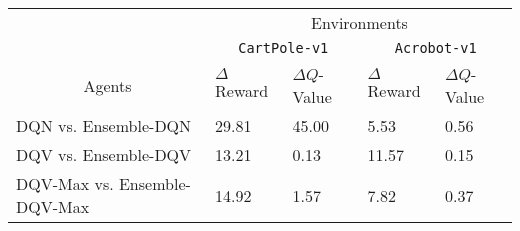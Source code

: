 \documentclass{article}
\begin{document}
\begin{table}[]
\begin{tabular}{@{}lllll@{}}
\toprule
\multicolumn{1}{c}{}                               & \multicolumn{4}{c}{Environments}                                                                                                                                                         \\
\multicolumn{1}{c}{}                               & \multicolumn{2}{c}{\texttt{CartPole-v1}}                                        & \multicolumn{2}{c}{\texttt{Acrobot-v1}}                                                                \\ \cmidrule(l){2-5}
\multicolumn{1}{c}{\multirow{-3}{*}{Agents}}       & $\Delta$Reward
                                                   & $\Delta Q$-Value
                                                                                                                                     & $\Delta$Reward                                             & $\Delta Q$-Value                                         \\ \midrule
\multicolumn{1}{|l|}{DQN vs. Ensemble-DQN}         & \multicolumn{1}{l|}{29.81} & \multicolumn{1}{l|}{\cellcolor[HTML]{FFFC9E}45.00} & \multicolumn{1}{l|}{\cellcolor[HTML]{FFFC9E}5.53}  & \multicolumn{1}{l|}{\cellcolor[HTML]{FFFC9E}0.56} \\ \midrule
\multicolumn{1}{|l|}{DQV vs. Ensemble-DQV}         & \multicolumn{1}{l|}{13.21} & \multicolumn{1}{l|}{0.13}                          & \multicolumn{1}{l|}{\cellcolor[HTML]{FFFC9E}11.57} & \multicolumn{1}{l|}{\cellcolor[HTML]{FFFC9E}0.15} \\ \midrule
\multicolumn{1}{|l|}{DQV-Max vs. Ensemble-DQV-Max} & \multicolumn{1}{l|}{14.92} & \multicolumn{1}{l|}{1.57}                          & \multicolumn{1}{l|}{\cellcolor[HTML]{FFFC9E}7.82}  & \multicolumn{1}{l|}{\cellcolor[HTML]{FFFC9E}0.37} \\ \bottomrule
\end{tabular}
\caption{}
\label{tab:my-table-4}
\end{table}
\end{document}
